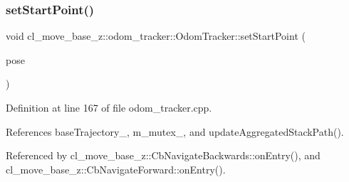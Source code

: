 \subsubsection{\texorpdfstring{set\+Start\+Point()}{setStartPoint()}\hspace{0.1cm}{\footnotesize\ttfamily [1/2]}}
{\footnotesize\ttfamily void cl\+\_\+move\+\_\+base\+\_\+z\+::odom\+\_\+tracker\+::\+Odom\+Tracker\+::set\+Start\+Point (\begin{DoxyParamCaption}\item[{const geometry\+\_\+msgs\+::\+Pose\+Stamped \&}]{pose }\end{DoxyParamCaption})}



Definition at line 167 of file odom\+\_\+tracker.\+cpp.



References base\+Trajectory\+\_\+, m\+\_\+mutex\+\_\+, and update\+Aggregated\+Stack\+Path().



Referenced by cl\+\_\+move\+\_\+base\+\_\+z\+::\+Cb\+Navigate\+Backwards\+::on\+Entry(), and cl\+\_\+move\+\_\+base\+\_\+z\+::\+Cb\+Navigate\+Forward\+::on\+Entry().


